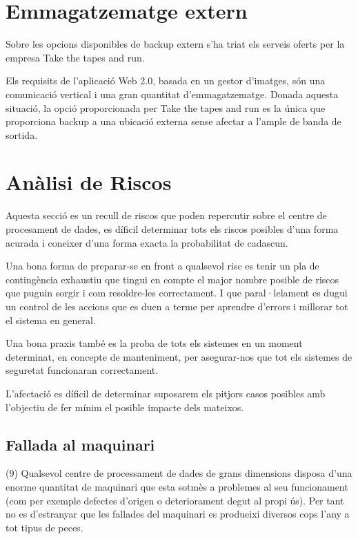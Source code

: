 \documentclass[a4paper, 11pt]{article}
\begin{document}
\section{Emmagatzematge extern}
Sobre les opcions disponibles de backup extern s’ha triat els serveis oferts per la empresa Take the tapes and run.

Els requisits de l’aplicació Web 2.0, basada en un gestor d’imatges, són una comunicació vertical i una gran quantitat d’emmagatzematge. Donada aquesta situació, la opció proporcionada per Take the tapes and run es la única que proporciona backup a una ubicació externa sense afectar a l'ample de banda de sortida.

\section{Anàlisi de Riscos}

Aquesta secció es un recull de riscos que poden repercutir sobre el centre de procesament de dades, es díficil determinar tots els riscos posibles d'una forma acurada i coneixer d'una forma exacta la probabilitat de cadascun.

Una bona forma de preparar-se en front a qualsevol risc es tenir un pla de contingència exhaustiu que tingui en compte el major nombre posible de riscos que puguin sorgir i com resoldre-les correctament. I que paral·lelament es dugui un control de les accions que es duen a terme per aprendre d'errors i millorar tot el sistema en general. 

Una bona praxis també es la proba de tots els sistemes en un moment determinat, en concepte de manteniment, per asegurar-nos que tot els sistemes de seguretat funcionaran correctament.

L'afectació es díficil de determinar suposarem els pitjors casos posibles amb l'objectiu de fer mínim el posible impacte dels mateixos.

\subsection{Fallada al maquinari}

(9) Qualsevol centre de processament de dades de grans dimensions disposa d'una enorme quantitat de maquinari que esta sotmès a problemes al seu funcionament (com per exemple defectes d'origen o deteriorament degut al propi ús). Per tant no es d'estranyar que les fallades del maquinari es produeixi diversos cops l'any a tot tipus de peces.
\end{document}
